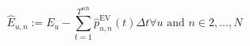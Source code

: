 \begin{equation}
	\hat{E}_{u,n} := E_u - \sum_{t=1}^{T^\text{sch}} \hat{p}^\text{EV}_{u,n}(t)\Delta t \forall u \text{ and } n \in {2,\dots,N}
	\label{ch3:equ:temporary-charging-demand}
\end{equation}